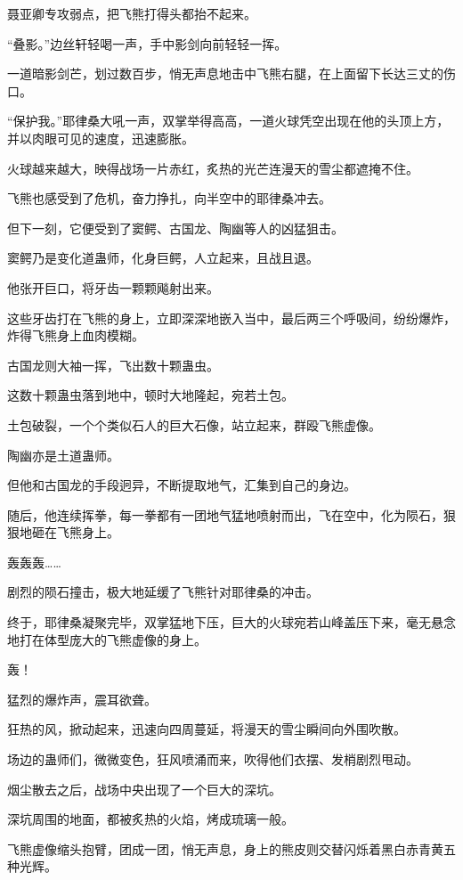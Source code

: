 \begin{this_body}
聂亚卿专攻弱点，把飞熊打得头都抬不起来。

“叠影。”边丝轩轻喝一声，手中影剑向前轻轻一挥。

一道暗影剑芒，划过数百步，悄无声息地击中飞熊右腿，在上面留下长达三丈的伤口。

“保护我。”耶律桑大吼一声，双掌举得高高，一道火球凭空出现在他的头顶上方，并以肉眼可见的速度，迅速膨胀。

火球越来越大，映得战场一片赤红，炙热的光芒连漫天的雪尘都遮掩不住。

飞熊也感受到了危机，奋力挣扎，向半空中的耶律桑冲去。

但下一刻，它便受到了窦鳄、古国龙、陶幽等人的凶猛狙击。

窦鳄乃是变化道蛊师，化身巨鳄，人立起来，且战且退。

他张开巨口，将牙齿一颗颗飚射出来。

这些牙齿打在飞熊的身上，立即深深地嵌入当中，最后两三个呼吸间，纷纷爆炸，炸得飞熊身上血肉模糊。

古国龙则大袖一挥，飞出数十颗蛊虫。

这数十颗蛊虫落到地中，顿时大地隆起，宛若土包。

土包破裂，一个个类似石人的巨大石像，站立起来，群殴飞熊虚像。

陶幽亦是土道蛊师。

但他和古国龙的手段迥异，不断提取地气，汇集到自己的身边。

随后，他连续挥拳，每一拳都有一团地气猛地喷射而出，飞在空中，化为陨石，狠狠地砸在飞熊身上。

轰轰轰……

剧烈的陨石撞击，极大地延缓了飞熊针对耶律桑的冲击。

终于，耶律桑凝聚完毕，双掌猛地下压，巨大的火球宛若山峰盖压下来，毫无悬念地打在体型庞大的飞熊虚像的身上。

轰！

猛烈的爆炸声，震耳欲聋。

狂热的风，掀动起来，迅速向四周蔓延，将漫天的雪尘瞬间向外围吹散。

场边的蛊师们，微微变色，狂风喷涌而来，吹得他们衣摆、发梢剧烈甩动。

烟尘散去之后，战场中央出现了一个巨大的深坑。

深坑周围的地面，都被炙热的火焰，烤成琉璃一般。

飞熊虚像缩头抱臂，团成一团，悄无声息，身上的熊皮则交替闪烁着黑白赤青黄五种光辉。


\end{this_body}
